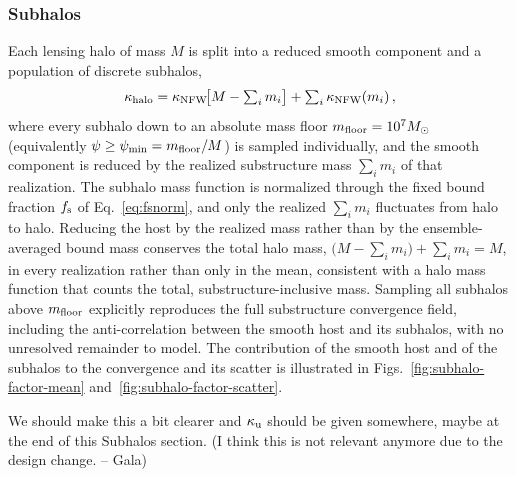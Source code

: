 \documentclass[aps,prd,10pt,nofootinbib,twocolumn,superscriptaddress,floatfix,notitlepage]{revtex4-1}
\newcommand{\Msun}{M_\odot}
\newcommand{\be}{\begin{equation}}
\newcommand{\ee}{\end{equation}}
\newcommand{\Gala}[1]{{\color{orange} (#1 -- Gala)}}
\newcommand{\R}[1]{{\color{red} #1}}
\begin{document}
\subsubsection{Subhalos}

Each lensing halo of mass $M$ is split into a reduced smooth component and a population of discrete subhalos,
\be \label{eq:reducedhost}
    \kappa_{\rm halo} = \kappa_{\rm NFW}\!\big[M - \textstyle\sum_i m_i\big] + \sum_i \kappa_{\rm NFW}(m_i) \,,
\ee
where every subhalo down to an absolute mass floor $m_{\rm floor} = 10^7\Msun$ (equivalently $\psi \geq \psi_{\rm min} = m_{\rm floor}/M$) is sampled individually, and the smooth component is reduced by the realized substructure mass $\sum_i m_i$ of that realization. The subhalo mass function is normalized through the fixed bound fraction $f_{\rm s}$ of Eq.~\eqref{eq:fsnorm}, and only the realized $\sum_i m_i$ fluctuates from halo to halo. Reducing the host by the realized mass rather than by the ensemble-averaged bound mass conserves the total halo mass, $\big(M - \sum_i m_i\big) + \sum_i m_i = M$, in every realization rather than only in the mean, consistent with a halo mass function that counts the total, substructure-inclusive mass. Sampling all subhalos above $m_{\rm floor}$ explicitly reproduces the full substructure convergence field, including the anti-correlation between the smooth host and its subhalos, with no unresolved remainder to model. The contribution of the smooth host and of the subhalos to the convergence and its scatter is illustrated in Figs.~\ref{fig:subhalo-factor-mean} and~\ref{fig:subhalo-factor-scatter}.


\R{We should make this a bit clearer and $\kappa_{\rm u}$ should be given somewhere, maybe at the end of this Subhalos section.}
\Gala{I think this is not relevant anymore due to the design change.}
\end{document}
